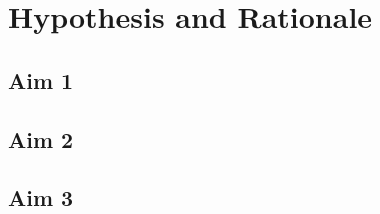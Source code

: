 \documentclass[../Dissertation]{subfiles}
\begin{document}
\section{Hypothesis and Rationale}\label{Hyptohesis_Rationale}
\vspace{-1ex}
\subsection{Aim 1}\label{aim:1}
    \lipsum[1]

\subsection{Aim 2}\label{aim:2}
    \lipsum[2]

\subsection{Aim 3}\label{aim:3}
    \lipsum[3]
\end{document}
